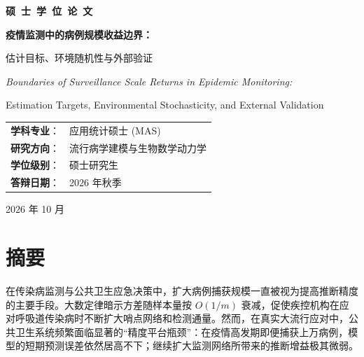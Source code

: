 \documentclass[12pt,a4paper,openany,twoside]{ctexbook}
\theoremstyle{plain}
\theoremstyle{definition}
\theoremstyle{remark}
\begin{document}
\frontmatter
\begin{titlepage}
    \centering
    \vspace*{1.5cm}
    {\huge\bfseries 硕\ 士\ 学\ 位\ 论\ 文\par}
    \vspace{2.5cm}
    
    {\fontsize{24pt}{30pt}\selectfont\bfseries 疫情监测中的病例规模收益边界：\par 估计目标、环境随机性与外部验证\par}
    \vspace{1.5cm}
    
    {\Large\itshape Boundaries of Surveillance Scale Returns in Epidemic Monitoring:\par Estimation Targets, Environmental Stochasticity, and External Validation\par}
    \vspace{3.5cm}
    
    \begin{minipage}{0.75\textwidth}
        \large\centering
        \begin{tabular}{ll}
            \textbf{学科专业}： & 应用统计硕士 (MAS) \\
            \textbf{研究方向}： & 流行病学建模与生物数学动力学 \\
            \textbf{学位级别}： & 硕士研究生 \\
            \textbf{答辩日期}： & 2026 年秋季 \\
        \end{tabular}
    \end{minipage}
    
    \vfill
    {\large 2026 年 10 月\par}
\end{titlepage}

\chapter*{摘\quad 要}

在传染病监测与公共卫生应急决策中，扩大病例捕获规模一直被视为提高推断精度的主要手段。大数定律暗示方差随样本量按 $O(1/m)$ 衰减，促使疾控机构在应对呼吸道传染病时不断扩大哨点网络和检测通量。然而，在真实大流行应对中，公共卫生系统频繁面临显著的“精度平台瓶颈”：在疫情高发期即便捕获上万病例，模型的短期预测误差依然居高不下；继续扩大监测网络所带来的推断增益极其微弱。
\end{document}
